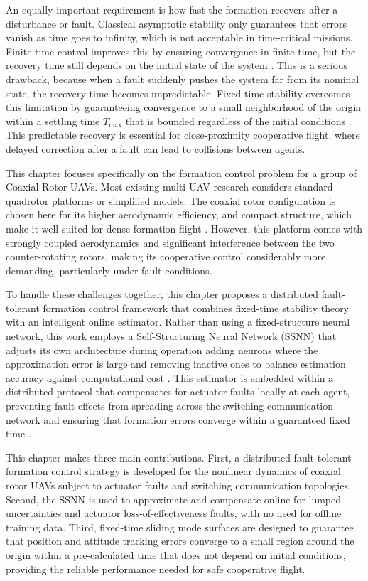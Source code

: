 An equally important requirement is how fast the formation
recovers after a disturbance or fault. Classical asymptotic stability only
guarantees that errors vanish as time goes to infinity, which is not acceptable
in time-critical missions. Finite-time control improves this by ensuring
convergence in finite time, but the recovery time still depends on the initial
state of the system \cite{Bhat2000, fxt}. This is a serious drawback, because
when a fault suddenly pushes the system far from its nominal state, the recovery
time becomes unpredictable. Fixed-time stability overcomes this limitation by
guaranteeing convergence to a small neighborhood of the origin within a settling
time $T_{\max}$ that is bounded regardless of the initial conditions
\cite{Polyakov2012, Parsegov2013}. This predictable recovery is essential for
close-proximity cooperative flight, where delayed correction after a fault can
lead to collisions between agents.

This chapter focuses specifically on the formation control problem for a group
of Coaxial Rotor UAVs. Most existing multi-UAV research considers standard
quadrotor platforms or simplified models. The coaxial rotor configuration is
chosen here for its higher aerodynamic efficiency, and compact structure, which make it well suited for dense formation
flight \cite{coaxial_review1, Coaxial_Ref2}. However, this platform comes with
strongly coupled aerodynamics and significant interference between the two
counter-rotating rotors, making its cooperative control considerably more
demanding, particularly under fault conditions.

To handle these challenges together, this chapter proposes a distributed
fault-tolerant formation control framework that combines fixed-time stability
theory with an intelligent online estimator. Rather than using a fixed-structure
neural network, this work employs a Self-Structuring Neural Network (SSNN) that
adjusts its own architecture during operation  adding neurons where the
approximation error is large and removing inactive ones  to balance estimation
accuracy against computational cost \cite{SSNN1, SSNN_Ref2}. This estimator is
embedded within a distributed protocol that compensates for actuator
faults locally at each agent, preventing fault effects from spreading across
the switching communication network and ensuring that formation errors converge
within a guaranteed fixed time \cite{FixedTime_Formation, Fixed_Time_Formation_2023}.

This chapter makes three main contributions. First, a distributed
fault-tolerant formation control strategy is developed for the nonlinear dynamics
of coaxial rotor UAVs subject to actuator faults and switching communication
topologies. Second, the SSNN is used to approximate and compensate online for
lumped uncertainties and actuator loss-of-effectiveness faults, with no need
for offline training data. Third, fixed-time sliding mode surfaces are designed
to guarantee that position and attitude tracking errors converge to a small
region around the origin within a pre-calculated time that does not depend on
initial conditions, providing the reliable performance needed for safe
cooperative flight.

